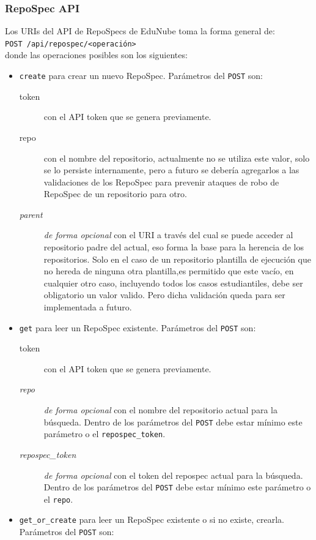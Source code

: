 \subsubsection{RepoSpec API}
Los URIs del API de RepoSpecs de EduNube toma la forma general de: \\
\texttt{POST /api/repospec/<operación>} \\
donde las operaciones posibles son los siguientes:
\begin{itemize}
	\item \texttt{create} para crear un nuevo RepoSpec. Parámetros del \texttt{POST} son:
    \begin{description}
    	\item[token] con el API token que se genera previamente.
        \item[repo] con el nombre del repositorio, actualmente no se utiliza este valor, solo se lo persiste internamente, pero a futuro se debería  agregarlos a las validaciones de los RepoSpec para prevenir ataques de robo de RepoSpec de un repositorio para otro.
        \item[\textit{parent}] \textit{de forma opcional} con el URI a través del cual se puede acceder al repositorio padre del actual, eso forma la base para la herencia de los repositorios. Solo en el caso de un repositorio plantilla de ejecución que no hereda de ninguna otra plantilla,es permitido que este vacío, en cualquier otro caso, incluyendo todos los casos estudiantiles, debe ser obligatorio un valor valido. Pero dicha validación queda para ser implementada a futuro.
    \end{description}
    \item \texttt{get} para leer un RepoSpec existente. Parámetros del \texttt{POST} son:
    \begin{description}
    	\item[token] con el API token que se genera previamente.
        \item[\textit{repo}] \textit{de forma opcional} con el nombre del repositorio actual para la búsqueda. Dentro de los parámetros del \texttt{POST} debe estar mínimo este parámetro o el \texttt{repospec\_token}.
        \item[\textit{repospec\_token}] \textit{de forma opcional} con el token del repospec actual para la búsqueda. Dentro de los parámetros del \texttt{POST} debe estar mínimo este parámetro o el \texttt{repo}.
    \end{description}
    \item \texttt{get\_or\_create} para leer un RepoSpec existente o si no existe, crearla. Parámetros del \texttt{POST} son:

\end{itemize}
